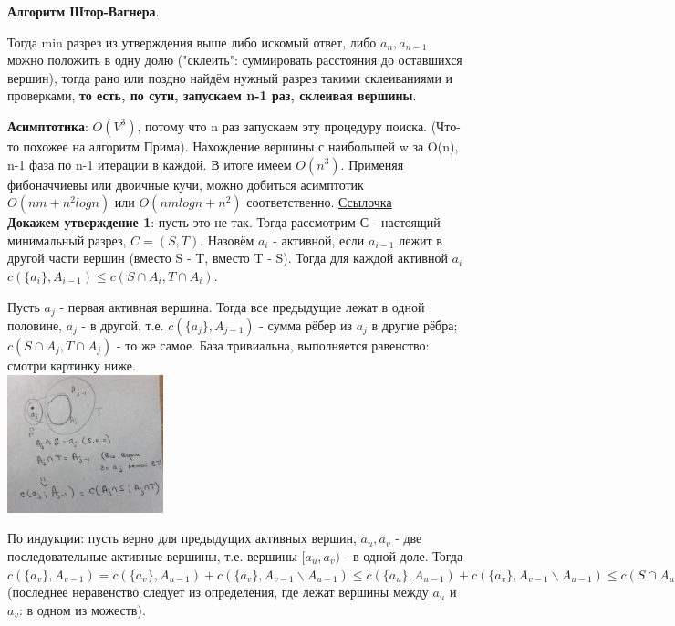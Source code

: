 \textbf{Алгоритм Штор-Вагнера}.

Тогда min разрез из утверждения выше либо искомый ответ, либо $a_n, a_{n-1}$ можно положить в одну долю ("склеить": суммировать расстояния до оставшихся вершин), тогда рано или поздно найдём нужный разрез такими склеиваниями и проверками, \textbf{то есть, по сути, запускаем n-1 раз, склеивая вершины}.

\textbf{Асимптотика}: $O(V^3)$, потому что n раз запускаем эту процедуру поиска. (Что-то похожее на алгоритм Прима). Нахождение вершины с наибольшей w за O(n), n-1 фаза по n-1 итерации в каждой. В итоге имеем $O(n^3)$. Применяя фибоначчиевы или двоичные кучи, можно добиться асимптотик $O(nm+n^2logn)$ или $O(nmlogn+n^2)$ соответственно. \href{shorturl.at/hzM04}{Ссылочка}\\

\textbf{Докажем утверждение 1}: пусть это не так. Тогда рассмотрим С - настоящий минимальный разрез, $C = (S, T)$. Назовём $a_i$ - активной, если $a_{i-1}$ лежит в другой части вершин (вместо S - T, вместо T - S). Тогда для каждой активной $a_i$ $c(\{a_i\}, A_{i-1}) \leqslant c(S\cap A_i, T \cap A_i)$.

Пусть $a_j$ - первая активная вершина. Тогда все предыдущие лежат в одной половине, $a_j$ - в другой, т.е. $c(\{a_j\}, A_{j-1})$ - сумма рёбер из $a_j$ в другие рёбра; $c(S\cap A_j, T \cap A_j)$ - то же самое. База тривиальна, выполняется равенство: смотри картинку ниже. \\

\includegraphics[height=4cm]{images/87-92_base}

По индукции: пусть верно для предыдущих активных вершин, $a_u, a_v$ - две последовательные активные вершины, т.е. вершины $[a_u, a_v)$ - в одной доле. Тогда $c(\{a_v\}, A_{v-1}) = c(\{a_v\}, A_{u-1}) + c(\{a_v\}, A_{v-1} \backslash A_{u-1}) \leqslant c(\{a_u\}, A_{u-1}) + c(\{a_v\}, A_{v-1} \backslash A_{u-1}) \leqslant c(S \cap A_u, T \cap A_u) + (c(S \cap A_v, T \cap A_v) - c(S \cap A_u, T \cap A_u)) = c(S \cap A_v, T \cap A_v)$ (последнее неравенство следует из определения, где лежат вершины между $a_u$ и $a_v$: в одном из можеств). \\

